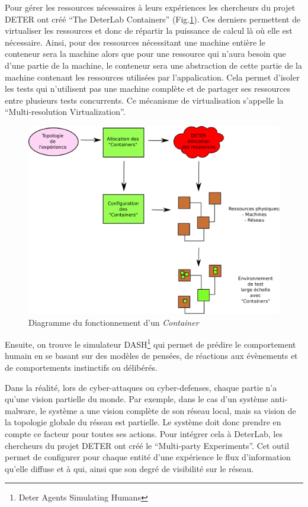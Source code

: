 Pour gérer les ressources nécessaires à leurs expériences les
chercheurs du projet DETER ont créé ``The DeterLab Containers''
(Fig.\ref{Conteneur}). Ces derniers permettent de virtualiser les
ressources et donc de répartir la puissance de calcul là où elle est
nécessaire. Ainsi, pour des ressources nécessitant une machine entière
le conteneur sera la machine alors que pour une ressource qui n'aura
besoin que d'une partie de la machine, le conteneur sera une
abstraction de cette partie de la machine contenant les ressources
utilisées par l'appalication. Cela permet d'isoler les tests qui
n'utilisent pas une machine complète et de partager ses ressources
entre plusieurs tests concurrents. Ce mécanisme de virtualisation
s'appelle la ``Multi-resolution Virtualization''.

\begin{figure}
  \centering \includegraphics[scale=0.75]{Pictures/png/Deter_fonctionnement_container_v2}
  \caption{Diagramme du fonctionnement d'un \textit{Container}}
  \label{Conteneur}
\end{figure}

Ensuite, on trouve le simulateur DASH\footnote{Deter Agents Simulating Humans}
qui permet de prédire le comportement humain en se basant sur des modèles de
pensées, de réactions aux évènements et de comportements instinctifs ou
délibérés.

Dans la réalité, lors de cyber-attaques ou cyber-defenses, chaque
partie n'a qu'une vision partielle du monde. Par exemple, dans le cas
d'un système anti-malware, le système a une vision complète de son
réseau local, mais sa vision de la topologie globale du réseau est
partielle. Le système doit donc prendre en compte ce facteur pour
toutes ses actions. Pour intégrer cela à DeterLab, les chercheurs du
projet DETER ont créé le ``Multi-party Experiments''. Cet outil permet
de configurer pour chaque entité d'une expérience le flux
d'information qu'elle diffuse et à qui, ainsi que son degré de
visibilité sur le réseau.

